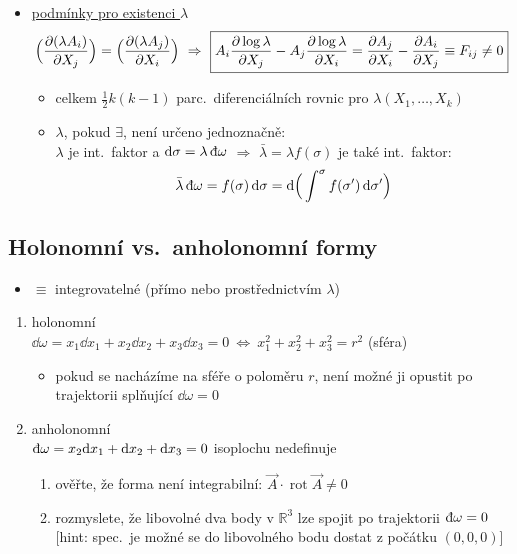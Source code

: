 \begin{itemize}
  \item \underline{podmínky pro existenci $\lambda$} 
  \[
    \Big(\pdv{(\lambda A_i)}{X_j}\Big) = \Big(\pdv{(\lambda A_j)}{X_i}\Big)
    \ \Rightarrow\
    \boxed{A_i\pdv{\log\lambda}{X_j} - A_j\pdv{\log\lambda}{X_i} = \pdv{A_j}{X_i} - \pdv{A_i}{X_j} \equiv F_{ij}\neq 0}
  \]
  \begin{itemize}
    \item[--] celkem $\frac12k(k-1)$ parc.\ diferenciálních rovnic pro $\lambda(X_1,\dots,X_k)$
    \item[--] $\lambda$, pokud $\exists$, není určeno jednoznačně: \\
    $\lambda$ je int.\ faktor a $\dd\sigma = \lambda\,\dbar\omega$ $\Rightarrow$ $\bar\lambda = \lambda f(\sigma)$ je také int.\ faktor:
    \[ \bar\lambda\,\dbar\omega = f(\sigma)\,\dd\sigma = \dd\Big(\int^\sigma f(\sigma')\,\dd\sigma'\Big) \]
  \end{itemize}
\end{itemize}
\strana{L3c-2}
\subsection*{Holonomní vs.\ anholonomní formy}
\begin{itemize}
  \item {} $\equiv$ integrovatelné (přímo nebo prostřednictvím $\lambda$)
\end{itemize}
\begin{priklad}[Př.]
\begin{enumerate}[label=\arabic*)]
  \item holonomní \\
  $\dd\omega = x_1\dd x_1 + x_2\dd x_2 + x_3\dd x_3 = 0 \ \Leftrightarrow\ x_1^2 + x_2^2 + x_3^2 = r^2$ \quad (sféra)
  \begin{itemize}[nosep]
    \item pokud se nacházíme na sféře o poloměru $r$, není možné ji opustit po trajektorii splňující $\dd\omega = 0$
  \end{itemize}
  \item anholonomní \\
  $\dbar\omega = x_2\dd x_1 + \dd x_2 + \dd x_3 = 0$ \quad isoplochu nedefinuje
  \begin{enumerate}[label=\alph*)]
    \item ověřte, že forma není integrabilní: $\vec A\cdot\operatorname{rot}\vec A\neq 0$
    \item rozmyslete, že libovolné dva body v $\mathbb{R}^3$ lze spojit po trajektorii $\dbar\omega = 0$ \\
    {[hint: spec.\ je možné se do libovolného bodu dostat z počátku $(0,0,0)$]}
  \end{enumerate}
\end{enumerate}
\end{priklad}

